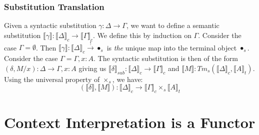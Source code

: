 \documentclass[12pt]{article}
\theoremstyle{definition}
\newcommand{\den}[1]{\llbracket #1 \rrbracket}
\begin{document}
\subsubsection{Substitution Translation}
Given a syntactic substitution $\gamma : \Delta \to \Gamma$, we want to define a semantic substitution $\den{\gamma} : \den{\Delta}_c \to \den{\Gamma}_c$. We define this by induction on $\Gamma$. Consider the case $\Gamma = \emptyset$. Then $\den{\gamma} : \den{\Delta}_c \xrightarrow{!} \bullet_s$ is \textit{the} unique map into the terminal object $\bullet_s$. Consider the case $\Gamma = \Gamma , x : A$. The syntactic substitution is then of the form $(\delta, M/x) : \Delta \to \Gamma, x : A$ giving us $\den{\delta}_{sub} : \den{\Delta}_c \to \den{\Gamma}_c$ and $\den{M} : Tm_s(\den{\Delta}_c, \den{A}_t)$. Using the universal property of $\times_s$, we have: 
\[
    (\den{\delta},\den{M}) : \den{\Delta}_c \to \den{\Gamma}_c \times_s \den{A}_t   
\]


\section{Context Interpretation is a Functor}
\end{document}
